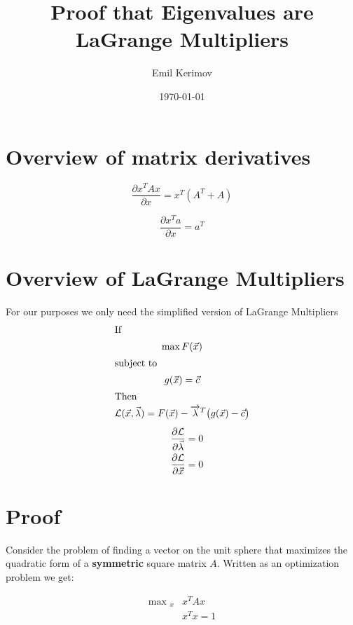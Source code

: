 \documentclass[a4paper]{article}
\title{Proof that Eigenvalues are LaGrange Multipliers}
\author{Emil Kerimov}
\date{\today}
\begin{document}
\maketitle

\section{Overview of matrix derivatives}

\begin{equation}
\frac{\partial x^T A x}{\partial x} = x^T(A^T + A)
\end{equation}

\begin{equation}
\frac{\partial x^T a}{\partial x} = a^T
\end{equation}

\section{Overview of LaGrange Multipliers}
For our purposes we only need the simplified version of LaGrange Multipliers
\begin{gather*}
\shortintertext{If}
\max F(\vec{x})\\
\shortintertext{subject to}
g(\vec{x}) = \vec{c}\\
\shortintertext{Then}
\mathcal{L}(\vec{x}, \vec{\lambda}) = F(\vec{x}) - \overrightarrow{\lambda}^T \bigl(g(\vec{x}) - \vec{c}\bigr) \\[1ex]
\begin{alignedat}{2}
\quad&& \frac{\partial \mathcal{L}}{\partial \vec{\lambda}} &= 0\\
\quad&& \frac{\partial \mathcal{L}}{\partial \vec{x}} &= 0\\
\end{alignedat}
\end{gather*}

\section{Proof}

Consider the problem of finding a vector on the unit sphere that maximizes the quadratic form of a \textbf{symmetric} square matrix $A$. Written as an optimization problem we get:

\begin{align}
\text{max }_{x} & x^{T} A x \\
& x^{T} x = 1  \nonumber
\end{align}
\end{document}
